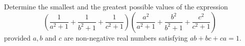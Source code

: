 Determine the smallest and the greatest possible values of the expression$$\left( \frac{1}{a^2+1}+\frac{1}{b^2+1}+\frac{1}{c^2+1}\right)\left( \frac{a^2}{a^2+1}+\frac{b^2}{b^2+1}+\frac{c^2}{c^2+1}\right)$$provided $a,b$ and $c$ are non-negative real numbers satisfying $ab+bc+ca=1$.